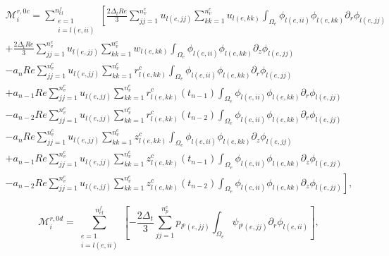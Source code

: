 \documentclass{article}
\begin{document}
\begin{equation}
\begin{array}{l} \mathcal{M}_i^{r,0c} = \sum_{\substack{e=1 \\ i=l(e,ii)}}^{n_{el}^f} \left[ \frac{2\Delta_t Re}{3} \sum_{jj=1}^{n_v^e} u_{l(e,jj)} \sum_{kk=1}^{n_v^e} u_{l(e,kk)} \int_{\Omega_e} \phi_{l(e,ii)} \phi_{l(e,kk)} \partial_r \phi_{l(e,jj)} \right. \\ + \frac{2\Delta_t Re}{3} \sum_{jj=1}^{n_v^e} u_{l(e,jj)} \sum_{kk=1}^{n_v^e} w_{l(e,kk)} \int_{\Omega_e} \phi_{l(e,ii)} \phi_{l(e,kk)} \partial_z \phi_{l(e,jj)} \\ - a_n Re \sum_{jj=1}^{n_v^e} u_{l(e,jj)} \sum_{kk=1}^{n_v^e} r_{l(e,kk)}^c \int_{\Omega_e} \phi_{l(e,ii)} \phi_{l(e,kk)} \partial_r \phi_{l(e,jj)} \\ + a_{n-1} Re \sum_{jj=1}^{n_v^e} u_{l(e,jj)} \sum_{kk=1}^{n_v^e} r_{l(e,kk)}^c(t_{n-1}) \int_{\Omega_e} \phi_{l(e,ii)} \phi_{l(e,kk)} \partial_r \phi_{l(e,jj)} \\ - a_{n-2} Re \sum_{jj=1}^{n_v^e} u_{l(e,jj)} \sum_{kk=1}^{n_v^e} r_{l(e,kk)}^c(t_{n-2}) \int_{\Omega_e} \phi_{l(e,ii)} \phi_{l(e,kk)} \partial_r \phi_{l(e,jj)} \\ - a_n Re \sum_{jj=1}^{n_v^e} u_{l(e,jj)} \sum_{kk=1}^{n_v^e} z_{l(e,kk)}^c \int_{\Omega_e} \phi_{l(e,ii)} \phi_{l(e,kk)} \partial_z \phi_{l(e,jj)} \\ + a_{n-1} Re \sum_{jj=1}^{n_v^e} u_{l(e,jj)} \sum_{kk=1}^{n_v^e} z_{l(e,kk)}^c(t_{n-1}) \int_{\Omega_e} \phi_{l(e,ii)} \phi_{l(e,kk)} \partial_z \phi_{l(e,jj)} \\ \left. - a_{n-2} Re \sum_{jj=1}^{n_v^e} u_{l(e,jj)} \sum_{kk=1}^{n_v^e} z_{l(e,kk)}^c(t_{n-2}) \int_{\Omega_e} \phi_{l(e,ii)} \phi_{l(e,kk)} \partial_z \phi_{l(e,jj)} \right], \end{array} \tag{4.124}
\end{equation}

\begin{equation}
\mathcal{M}_i^{r,0d} = \sum_{\substack{e=1 \\ i=l(e,ii)}}^{n_{el}^f} \left[ -\frac{2\Delta_t}{3} \sum_{jj=1}^{n_p^e} p_{l^p(e,jj)} \int_{\Omega_e} \psi_{l^p(e,jj)} \partial_r \phi_{l(e,ii)} \right], \tag{4.125}
\end{equation}
\end{document}
